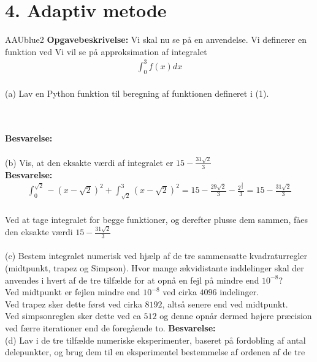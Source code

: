 \section*{4. Adaptiv metode}
% 
%
\begin{color}{AAUblue2}
%
\textbf{Opgavebeskrivelse:} 
Vi skal nu se på en anvendelse. Vi definerer en funktion ved
%
%
Vi vil se på approksimation af integralet 
\begin{align}
\int_{0}^{3}f(x)dx    
\end{align}
\\
(a) Lav en Python funktion til beregning af funktionen defineret i (1).
% 
\end{color}
\\\\
% 
\textbf{Besvarelse:} \\\\
(b) Vis, at den eksakte værdi af integralet er $15-\frac{31\sqrt{2}}{3}$\\
\textbf{Besvarelse:} \\ 
\begin{align*}
\int^{\sqrt{2}}_0-(x-\sqrt{2})^2+\int^3_{\sqrt{2}}(x-\sqrt{2})^2=15-\frac{29\sqrt{2}}{3}-\frac{2^{\frac{3}{2}}}{3}=15-\frac{31\sqrt{2}}{3} 
\end{align*} \\
Ved at tage integralet for begge funktioner, og derefter plusse dem sammen, fåes den eksakte værdi $15-\frac{31\sqrt{2}}{3}$\\\\
(c) Bestem integralet numerisk ved hjælp af de tre sammensatte kvadraturregler
(midtpunkt, trapez og Simpson). Hvor mange ækvidistante inddelinger skal der
anvendes i hvert af de tre tilfælde for at opnå en fejl på mindre end $10^{-8}$?\\
Ved midtpunkt er fejlen mindre end $10^{-8}$ ved cirka $4096$ indelinger.\\
Ved trapez sker dette først ved cirka $8192$, altså senere end ved midtpunkt.\\ 
Ved simpsonreglen sker dette ved ca $512$ og denne opnår dermed højere præcision ved færre iterationer end de foregående to.
\textbf{Besvarelse:} \\
(d) Lav i de tre tilfælde numeriske eksperimenter, baseret på fordobling af antal delepunkter, og brug dem til en eksperimentel bestemmelse af ordenen af de tre
